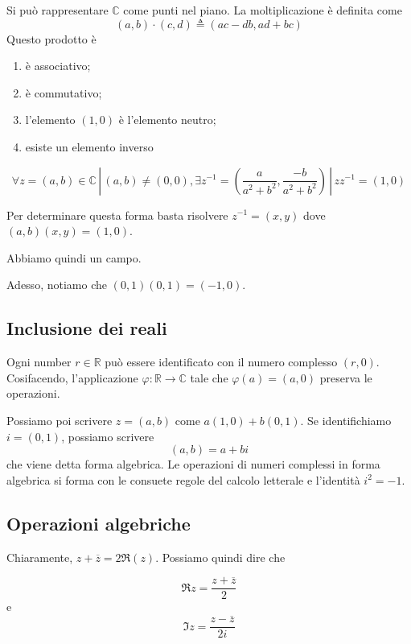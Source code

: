 \documentclass[a4paper]{article}
\begin{document}
Si può rappresentare \(\mathbb{C}\) come punti nel piano.
La moltiplicazione è definita come
\[
    (a,b) \cdot (c,d) \triangleq (ac-db,ad+bc)
\]
Questo prodotto è
\begin{enumerate}
    \item è associativo;
    \item è commutativo;
    \item l'elemento \((1,0)\) è l'elemento neutro;
    \item esiste un elemento inverso
\end{enumerate}

\[
    \forall z=(a,b) \in \mathbb{C} \,|\, (a,b) \neq (0,0),
    \exists z^{-1} = \left(\frac{a}{a^2 + b^2}, \frac{-b}{a^2 + b^2}\right) \,|\,
    zz^{-1} = (1,0)
\]

Per determinare questa forma basta risolvere \(z^{-1} = (x,y)\) dove \((a,b)(x,y) = (1,0)\).

Abbiamo quindi un campo.

Adesso, notiamo che \((0,1)(0,1) = (-1, 0)\).

\subsection{Inclusione dei reali}

Ogni number \(r\in\mathbb{R}\) può essere identificato con il numero complesso \((r, 0)\).
Cosifacendo, l'applicazione \(\varphi\colon \mathbb{R} \to \mathbb{C}\)
tale che \(\varphi(a) = (a,0)\) preserva le operazioni.

Possiamo poi scrivere \(z=(a,b)\) come \(a(1,0) + b(0,1)\).
Se identifichiamo \(i=(0,1)\), possiamo scrivere
\[
    (a,b) = a+bi
\]
che viene detta forma algebrica.
Le operazioni di numeri complessi in forma algebrica si forma con le consuete regole del calcolo letterale
e l'identità \(i^2 = -1\).

\subsection{Operazioni algebriche}


Chiaramente, \(z + \overline{z} = 2\Re(z)\). Possiamo quindi dire che

\[
    \Re z = \frac{z + \overline{z}}{2}
\]
e
\[
    \Im z = \frac{z-\overline{z}}{2i}
\]
\end{document}
